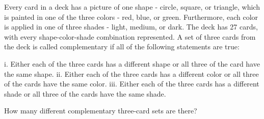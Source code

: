 Every card in a deck has a picture of one shape - circle, square, or triangle, which is painted in one of the three colors - red, blue, or green.  Furthermore, each color is applied in one of three shades - light, medium, or dark.  The deck has 27 cards, with every shape-color-shade combination represented.  A set of three cards from the deck is called complementary if all of the following statements are true:

i. Either each of the three cards has a different shape or all three of the card have the same shape.
ii. Either each of the three cards has a different color or all three of the cards have the same color.
iii. Either each of the three cards has a different shade or all three of the cards have the same shade.

How many different complementary three-card sets are there?
